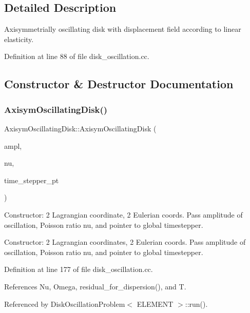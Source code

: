 \subsection{Detailed Description}
Axisymmetrially oscillating disk with displacement field according to linear elasticity. 

Definition at line 88 of file disk\+\_\+oscillation.\+cc.



\subsection{Constructor \& Destructor Documentation}
\mbox{\label{classAxisymOscillatingDisk_a7671a9c1b8d4d854752ea14aa4f5865d}} 
\subsubsection{\texorpdfstring{Axisym\+Oscillating\+Disk()}{AxisymOscillatingDisk()}}
{\footnotesize\ttfamily Axisym\+Oscillating\+Disk\+::\+Axisym\+Oscillating\+Disk (\begin{DoxyParamCaption}\item[{const double \&}]{ampl,  }\item[{const double \&}]{nu,  }\item[{Time\+Stepper $\ast$}]{time\+\_\+stepper\+\_\+pt }\end{DoxyParamCaption})}



Constructor\+: 2 Lagrangian coordinate, 2 Eulerian coords. Pass amplitude of oscillation, Poisson ratio nu, and pointer to global timestepper. 

Constructor\+: 2 Lagrangian coordinates, 2 Eulerian coords. Pass amplitude of oscillation, Poisson ratio nu, and pointer to global timestepper. 

Definition at line 177 of file disk\+\_\+oscillation.\+cc.



References Nu, Omega, residual\+\_\+for\+\_\+dispersion(), and T.



Referenced by Disk\+Oscillation\+Problem$<$ E\+L\+E\+M\+E\+N\+T $>$\+::run().

